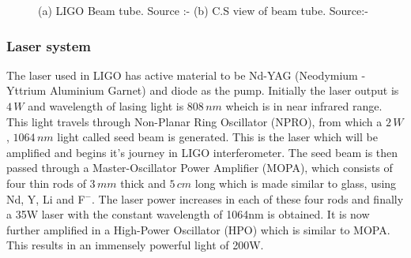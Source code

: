 \begin{figure}[h]
    \centering
    \qquad
    \caption{(a) LIGO Beam tube. Source :- \cite{vacuum} (b) C.S view of beam tube. Source:- \cite{althouse2001precision}}
\end{figure}

\subsubsection{Laser system}

The laser used in LIGO has active material to be Nd-YAG (Neodymium - Yttrium Aluminium Garnet) and diode as the pump. Initially the laser output is $4\,W$ and wavelength of lasing light is $808\,nm$ wheich is in near infrared range. This light travels through Non-Planar Ring Oscillator (NPRO), from which a $2\,W$, $1064\,nm$ light called seed beam is generated. This is the laser which will be amplified and begins it's journey in LIGO interferometer. The seed beam is then passed through a Master-Oscillator Power Amplifier (MOPA), which consists of four thin rods of $3\,mm$ thick and $5\,cm$ long which is made similar to glass, using Nd, Y, Li and F$^{-}$. The laser power increases in each of these four rods and finally a 35W laser with the constant wavelength of 1064nm is obtained. It is now further amplified in a High-Power Oscillator (HPO) which is similar to MOPA. This results in an immensely powerful light of 200W. \cite{laser} 

